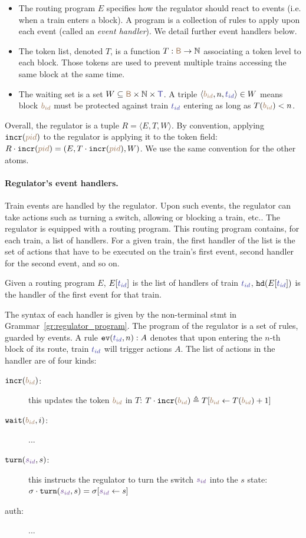 \documentclass[runningheads]{llncs}
\newcommand{\Nat}{{\mbox{$\mathbb{N}$}}}
\newcommand{\tuple}[1]{\ensuremath{\langle #1\rangle}}
\newcommand{\posFmt}[1]{{\color{poscolor}{#1}}}
\newcommand{\blocks}{{\posFmt{\mathsf{B}}}}
\newcommand{\bid}[1]{\ensuremath{\posFmt{b_{#1}}}}
\newcommand{\swFmt}[1]{{\color{swcolor}{#1}}}
\newcommand{\sid}[1]{\ensuremath{\swFmt{s_{#1}}}}
\newcommand{\trainFmt}[1]{{\color{traincolor} #1}}
\newcommand{\trains}{{\trainFmt{\mathsf{T}}}}
\newcommand{\tid}[1]{\ensuremath{\trainFmt{t_{#1}}}}
\newcommand{\handlerOf}[2]{\ensuremath{#1[\trainFmt{#2}]}}
\newcommand{\regTuple}[3]{\tuple{#1, #2, #3}}
\newcommand{\evGuard}[2]{\ensuremath{\mathtt{ev}(\trainFmt{#1}, #2)}}
\newcommand{\ev}[3]{\evGuard{#1}{#2}: #3}
\newcommand{\incr}[1]{{\mbox{\ensuremath{\mathtt{incr}(\posFmt{#1})}}}\xspace}
\newcommand{\turn}[2]{{\mbox{\ensuremath{\mathtt{turn}(#1, #2)}}}\xspace}
\newcommand{\tokens}{\ensuremath{T}}
\newcommand{\tokenOf}[1]{\ensuremath{T(\posFmt{#1})}}
\newcommand{\wait}[2]{{\mbox{\ensuremath{\mathtt{wait}(\posFmt{#1}, #2)}}}\xspace}
\newcommand{\head}[1]{\ensuremath{{\tt hd}(#1)}}
\begin{document}
\begin{itemize}
	\item The routing program $E$ specifies how the regulator should react to events (i.e. when a train enters a block). A program is a collection of rules to apply upon each event (called an \emph{event handler}). We detail further event handlers below.
	\item The token list, denoted $\tokens$, is a function  $\tokens: \blocks \to \Nat$ associating a token level to each block. Those tokens are used to prevent multiple trains accessing the same block at the same time.
	\item The waiting set is a set $W \subseteq \blocks \times \Nat \times \trains$. A triple $\tuple{\bid{id}, n, \tid{id}} \in W$ means block $\bid{id}$ must be protected against train $\tid{id}$ entering as long as $\tokenOf{\bid{id}} < n$.
\end{itemize}

Overall, the regulator is a tuple $R = \regTuple{E}{\tokens}{W}$. By convention, applying $\incr{pid}$ to the regulator is applying it to the token field: $R \cdot \incr{pid} = (E, T \cdot \incr{pid}, W)$. We use the same convention for the other atoms. 

\paragraph{Regulator's event handlers.}

Train events are handled by the regulator. Upon such events, the regulator can take actions such as turning a switch, allowing or blocking a train, etc.. The regulator is equipped with a routing program. This routing program contains, for each train, a list of handlers. For a given train, the first handler of the list is the set of actions that have to be executed on the train's first event, second handler for the second event, and so on.

Given a routing program $E$, $\handlerOf{E}{\tid{id}}$ is the list of handlers of train $\tid{id}$, $\head{\handlerOf{E}{\tid{id}}}$ is the handler of the first event for that train.

The syntax of each handler is given by the non-terminal {\ttfamily stmt} in Grammar~\ref{gr:regulator_program}.
The program of the regulator is a set of rules, guarded by events. A rule $\ev{\tid{id}}{n}{A}$ denotes that upon entering the $n$-th block of its route, train $\tid{id}$ will trigger actions $A$. The list of actions in the handler are of four kinds: 
\begin{description}
	\item[\incr{\bid{id}}:] this updates the token $\bid{id}$ in $T$:  $T \cdot \incr{\bid{id}}  \triangleq T[\bid{id} \leftarrow T(\bid{id})+1]$
	\item [\wait{\bid{id}}{i}:] ...\todo{}
	\item [\turn{\sid{id}}{s}:] this instructs the regulator to turn the switch $\sid{id}$ into the $s$ state: $\sigma\cdot\turn{\sid{id}}{s} = \sigma[\sid{id} \leftarrow s]$
	\item [auth:] ...\todo{}
\end{description}
\end{document}
